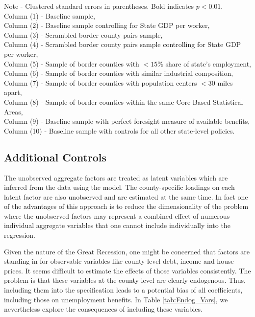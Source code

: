 \documentclass[12pt]{article}
\newcommand{\1}{\mathbf{1}}
\begin{document}
\begin{appendix}
\vspace{0.5cm}\begin{table}[ht]
  \centering
   \caption{Unemployment Benefit Extensions and Unemployment: Results Based on Additive Effects Specification}\label{tab:Benefits_on_unemp_OLS}
\small

\parbox{16.5cm}{\noindent Note - Clustered standard errors in parentheses. Bold indicates $p<0.01$.\\
Column (1) - Baseline sample,\\
Column (2) - Baseline sample controlling for State GDP per worker,\\
Column (3) - Scrambled border county pairs sample,\\
Column (4) - Scrambled border county pairs sample controlling for State GDP per worker,\\
Column (5) - Sample of border counties with  $<15\%$ share of state's employment,\\
Column (6) - Sample of border counties with similar industrial composition,\\
Column (7) - Sample of border counties with population centers $<30$ miles apart,\\
Column (8) - Sample of border counties within the same Core Based Statistical Areas,\\
Column (9) - Baseline sample with perfect foresight measure of available benefits,\\
Column (10) - Baseline sample with controls for all other state-level policies.
}
\vspace{-0.0cm}
\end{table}



\subsection{Additional Controls}

The unobserved aggregate factors are treated as latent variables which are inferred from the data using the model. The county-specific loadings on each latent factor are also unobserved and are estimated at the same time. In fact one of the advantages of this approach is to reduce the dimensionality of the problem where the unobserved factors may represent a combined effect of numerous individual aggregate variables that one cannot include individually into the regression.

Given the nature of the Great Recession, one might be concerned that factors are standing in for observable variables like county-level debt, income and house prices. It seems difficult to estimate the effects of those variables consistently. The problem is that these variables at the county level are clearly endogenous. Thus, including them into the specification leads to a potential bias of all coefficients, including those on unemployment benefits. In Table \ref{tab:Endog_Vars}, we nevertheless explore the consequences of including these variables.


\end{appendix}
\end{document}
